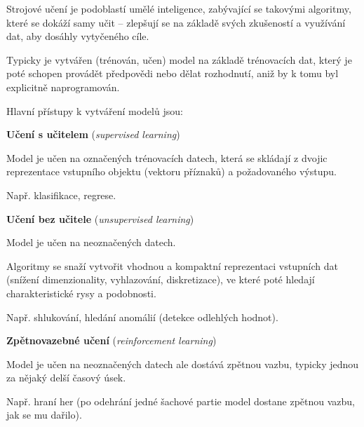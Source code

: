 \begin{compactitem}
    \item Strojové učení je podoblastí umělé inteligence, zabývající se takovými algoritmy, které se dokáží samy učit -- zlepšují se na základě svých zkušeností a využívání dat, aby dosáhly vytyčeného cíle.

    \item Typicky je vytvářen (trénován, učen) model na základě trénovacích dat, který je poté schopen provádět předpovědi nebo dělat rozhodnutí, aniž by k tomu byl explicitně naprogramován.

    \item Hlavní přístupy k vytváření modelů jsou: \begin{compactitem}
        \item \textbf{Učení s učitelem} (\textit{supervised learning}) \begin{compactitem}
            \item Model je učen na označených trénovacích
            datech, která se skládají z dvojic reprezentace vstupního objektu (vektoru příznaků) a
            požadovaného výstupu.
            \item Např. klasifikace, regrese.
        \end{compactitem}

        \item \textbf{Učení bez učitele} (\textit{unsupervised learning})
        \begin{compactitem}
            \item Model je učen na neoznačených datech.
            \item Algoritmy se snaží vytvořit vhodnou a kompaktní reprezentaci vstupních dat (snížení dimenzionality, vyhlazování, diskretizace), ve které poté hledají charakteristické rysy
            a podobnosti.
            \item Např. shlukování, hledání anomálií (detekce odlehlých hodnot).
        \end{compactitem}

        \item \textbf{Zpětnovazebné učení} (\textit{reinforcement learning})
        \begin{compactitem}
            \item Model je učen na neoznačených datech ale dostává zpětnou vazbu, typicky jednou za nějaký delší časový úsek.
            \item Např. hraní her (po odehrání jedné šachové partie model dostane zpětnou vazbu, jak se mu dařilo).
        \end{compactitem}
    \end{compactitem}


\end{compactitem}
